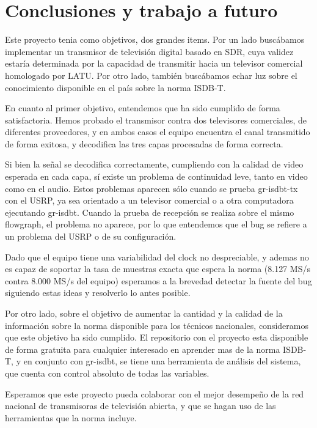 \chapter{Conclusiones y trabajo a futuro}

Este proyecto tenia como objetivos, dos grandes items. Por un lado buscábamos implementar un transmisor de televisión digital basado en SDR, cuya validez estaría determinada por la capacidad de transmitir hacia un televisor comercial homologado por LATU. Por otro lado, también buscábamos echar luz sobre el conocimiento disponible en el país sobre la norma ISDB-T. 

En cuanto al primer objetivo, entendemos que ha sido cumplido de forma satisfactoria. Hemos probado el transmisor contra dos televisores comerciales, de diferentes proveedores, y en ambos casos el equipo encuentra el canal transmitido de forma exitosa, y decodifica las tres capas procesadas de forma correcta. 

Si bien la señal se decodifica correctamente, cumpliendo con la calidad de video esperada en cada capa, sí existe un problema de continuidad leve, tanto en video como en el audio. Estos problemas aparecen sólo cuando se prueba gr-isdbt-tx con el USRP, ya sea orientado a un televisor comercial o a otra computadora ejecutando gr-isdbt. Cuando la prueba de recepción se realiza sobre el mismo flowgraph, el problema no aparece, por lo que entendemos que el bug se refiere a un problema del USRP o de su configuración.

Dado que el equipo tiene una variabilidad del clock no despreciable, y ademas no es capaz de soportar la tasa de muestras exacta que espera la norma (8.127 MS/s contra 8.000 MS/s del equipo) esperamos a la brevedad detectar la fuente del bug siguiendo estas ideas y resolverlo lo antes posible.

Por otro lado, sobre el objetivo de aumentar la cantidad y la calidad de la información sobre la norma disponible para los técnicos nacionales, consideramos que este objetivo ha sido cumplido. El repositorio con el proyecto esta disponible de forma gratuita para cualquier interesado en aprender mas de la norma ISDB-T, y en conjunto con gr-isdbt, se tiene una herramienta de análisis del sistema, que cuenta con control absoluto de todas las variables. 

Esperamos que este proyecto pueda colaborar con el mejor desempeño de la red nacional de transmisoras de televisión abierta, y que se hagan uso de las herramientas que la norma incluye. 

